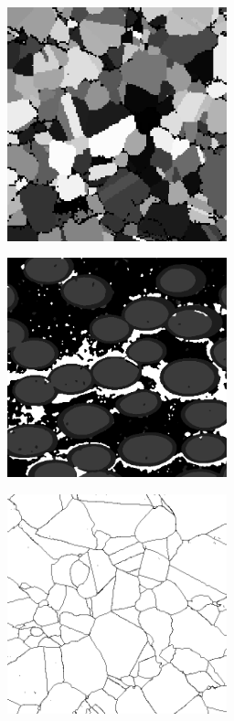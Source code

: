 \documentclass[12pt]{article} %
\begin{document}
\begin{figure}[htbp]
\begin{center}
\includegraphics[width=2.5in]{Type1.png}
\caption{}
\label{figure:Type1}
\end{center}
\end{figure}

\begin{figure}[htbp]
\begin{center}
\includegraphics[width=2.5in]{Type2.png}
\caption{}
\label{figure:Type2}
\end{center}
\end{figure}



\begin{figure}[htbp]
\begin{center}
\includegraphics[width=2.5in]{Type3.png}
\caption{}
\label{figure:Type3}
\end{center}
\end{figure}
\end{document}
